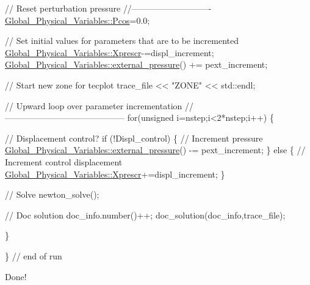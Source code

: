 \begin{DoxyCodeInclude}
 \textcolor{comment}{// Reset perturbation pressure}
 \textcolor{comment}{//----------------------------}
 \hyperlink{namespaceGlobal__Physical__Variables_ab55734aaa66260cd9d4bf68a4ecafdd5}{Global\_Physical\_Variables::Pcos}=0.0;
 
 \textcolor{comment}{// Set initial values for parameters that are to be incremented}
 \hyperlink{namespaceGlobal__Physical__Variables_a1c774c9cb221df909201e81e84b15f40}{Global\_Physical\_Variables::Xprescr}-=displ\_increment;
 \hyperlink{namespaceGlobal__Physical__Variables_a8c25ac6a672ea50d1b709292d1f4837b}{Global\_Physical\_Variables::external\_pressure}() += 
      pext\_increment;

 \textcolor{comment}{// Start new zone for tecplot}
 trace\_file << \textcolor{stringliteral}{"ZONE"} << std::endl;

 \textcolor{comment}{// Upward loop over parameter incrementation}
 \textcolor{comment}{//------------------------------------------}
 \textcolor{keywordflow}{for}(\textcolor{keywordtype}{unsigned} i=nstep;i<2*nstep;i++)
  \{
   
   \textcolor{comment}{// Displacement control?}
   \textcolor{keywordflow}{if} (!Displ\_control) 
    \{
     \textcolor{comment}{// Increment pressure}
     \hyperlink{namespaceGlobal__Physical__Variables_a8c25ac6a672ea50d1b709292d1f4837b}{Global\_Physical\_Variables::external\_pressure}() -= 
      pext\_increment;
    \}
   \textcolor{keywordflow}{else}
    \{
     \textcolor{comment}{// Increment control displacement}
     \hyperlink{namespaceGlobal__Physical__Variables_a1c774c9cb221df909201e81e84b15f40}{Global\_Physical\_Variables::Xprescr}+=displ\_increment;
    \}
   
   \textcolor{comment}{// Solve}
   newton\_solve();
   
   \textcolor{comment}{// Doc solution}
   doc\_info.number()++;
   doc\_solution(doc\_info,trace\_file);
   
  \} 
 
\} \textcolor{comment}{// end of run}

\end{DoxyCodeInclude}


Done!



 

